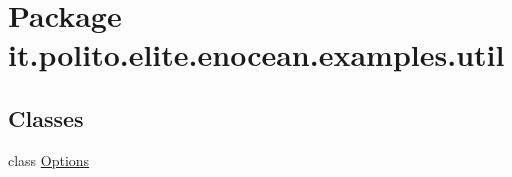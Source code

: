 \hypertarget{namespaceit_1_1polito_1_1elite_1_1enocean_1_1examples_1_1util}{}\section{Package it.\+polito.\+elite.\+enocean.\+examples.\+util}
\label{namespaceit_1_1polito_1_1elite_1_1enocean_1_1examples_1_1util}
\subsection*{Classes}
\begin{DoxyCompactItemize}
\item 
class \hyperlink{classit_1_1polito_1_1elite_1_1enocean_1_1examples_1_1util_1_1_options}{Options}
\end{DoxyCompactItemize}
